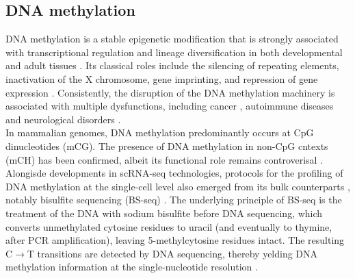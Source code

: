 \subsection{DNA methylation}
DNA methylation is a stable epigenetic modification that is strongly associated with transcriptional regulation and lineage diversification in both developmental and adult tissues \cite{Jin2018, Harrison2011, Lee2014, Smith2013, Jones2012}. Its classical roles include the silencing of repeating elements, inactivation of the X chromosome, gene imprinting, and repression of gene expression \cite{??}. Consistently, the disruption of the DNA methylation machinery is associated with multiple dysfunctions, including cancer \cite{Baylin2011}, autoimmune diseases \cite{Liu2013} and neurological disorders \cite{Amir1999}.\\
In mammalian genomes, DNA methylation predominantly occurs at CpG dinucleotides (mCG). The presence of DNA methylation in non-CpG cntexts (mCH) has been confirmed, albeit its functional role remains controverisal \cite{He2015, Ramsahoye2000, Lister2009}.\\

Alongisde developments in scRNA-seq technologies, protocols for the profiling of DNA methylation at the single-cell level also emerged from its bulk counterparts , notably bisulfite sequencing (BS-seq) \cite{Smallwood2014,Guo2013,Gravina2016,Farlik2015}. The underlying principle of BS-seq is the treatment of the DNA with sodium bisulfite before DNA sequencing, which converts unmethylated cytosine residues to uracil (and eventually to thymine, after PCR amplification), leaving 5-methylcytosine residues intact. The resulting C$\to$T transitions are detected by DNA sequencing, thereby yelding DNA methylation information at the single-nucleotide resolution \cite{Frommer1992,Clark2016,Clark2017}.\\

